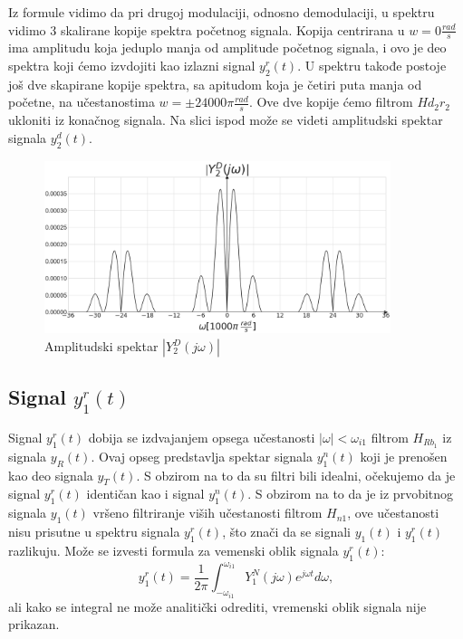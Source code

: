 \documentclass[titlepage,a4paper,12pt]{article}
\begin{document}
	Iz formule vidimo da pri drugoj modulaciji, odnosno demodulaciji, u spektru vidimo 3 skalirane kopije spektra početnog signala. Kopija centrirana u $w=0\frac{rad}{s}$ ima amplitudu koja jeduplo manja od amplitude početnog signala, i ovo je deo spektra koji ćemo izvdojiti kao izlazni signal $y_2^r(t)$. U spektru takođe postoje još dve skapirane kopije spektra, sa apitudom koja je četiri puta manja od početne, na učestanostima $w=\pm 24000\pi \frac{rad}{s}$. Ove dve kopije ćemo filtrom $H{d_2r_2}$ ukloniti iz konačnog signala.
	\clearpage
	Na slici ispod može se videti amplitudski spektar signala $y_2^d(t)$.
	\begin{figure}[ht]
		\centering
		\includegraphics[width=0.9\textwidth]{Images/AmpY2D.png}
		\caption{Amplitudski spektar $|Y_2^D(j\omega)|$}\label{fig:AmpY2D}
	\end{figure}
	\FloatBarrier
	
	\subsection{Signal $y_1^r(t)$}
	Signal $y_1^r(t)$ dobija se izdvajanjem opsega učestanosti $|\omega|<\omega_{i1}$ filtrom $H_{Rb_1}$ iz signala $y_R(t)$. Ovaj opseg predstavlja spektar signala $y_1^n(t)$ koji je prenošen kao deo signala $y_T(t)$. S obzirom na to da su filtri bili idealni, očekujemo da je signal $y_1^r(t)$ identičan kao i signal $y_1^n(t)$. S obzirom na to da je iz prvobitnog signala $y_1(t)$ vršeno filtriranje viših učestanosti filtrom $H_{n1}$, ove učestanosti nisu prisutne u spektru signala $y_1^r(t)$, što znači da se signali $y_1(t)$ i $y_1^r(t)$ razlikuju. Može se izvesti formula za vemenski oblik signala $y_1^r(t)$:
	\begin{equation}
		y_1^r(t) = \frac{1}{2\pi}\int_{-\omega_{i1}}^{\omega_{i1}}Y_1^N(j\omega)e^{j\omega t}d\omega,
	\end{equation}
	ali kako se integral ne može analitički odrediti, vremenski oblik signala nije prikazan.
	
\end{document}
